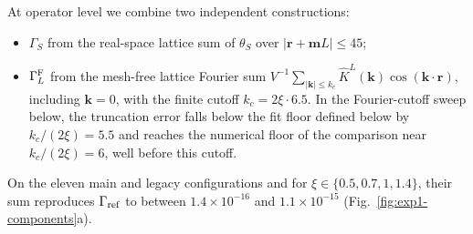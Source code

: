 At operator level we combine two independent constructions:
\begin{itemize}
\item $\Gamma_S$ from the real-space lattice sum of $\theta_S$ over $|\mathbf r+\mathbf mL|\le45$;
\item $\Gamma_L^{\rm F}$ from the mesh-free lattice Fourier sum
  $V^{-1}\sum_{|\mathbf k|\le k_c}\hat K^L(\mathbf k)\cos(\mathbf k\cdot\mathbf r)$, including $\mathbf k=0$, with the
  finite cutoff $k_c=2\xi\cdot6.5$. In the Fourier-cutoff sweep below, the truncation error falls below the fit floor
  defined below by $k_c/(2\xi)=5.5$ and reaches the numerical floor of the comparison near $k_c/(2\xi)=6$, well before
  this cutoff.
\end{itemize}
On the eleven main and legacy configurations and for $\xi\in\{0.5,0.7,1,1.4\}$, their sum reproduces $\Gamma_{\rm ref}$ to between $1.4\times10^{-16}$ and $1.1\times10^{-15}$ (Fig.~\ref{fig:exp1-components}a).


